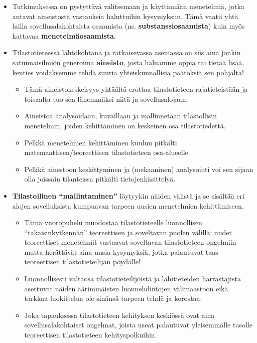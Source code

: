 \documentclass[
]{book}
\providecommand{\tightlist}{%
  \setlength{\itemsep}{0pt}\setlength{\parskip}{0pt}}
\begin{document}
\begin{itemize}
  \begin{itemize}
  \tightlist
  \item
    Tutkimuksessa on pystyttävä valitsemaan ja käyttämään menetelmiä, jotka antavat aineistosta vastauksia haluttuihin kysymyksiin. Tämä vaatii yhtä lailla sovellusalakohtaista osaamista (ns. \textbf{substanssiosaamista}) kuin myös kattavaa \textbf{menetelmäosaamista}.
  \end{itemize}
\end{itemize}

\hfill\break
\hfill\break

\begin{itemize}
\tightlist
\item
  Tilastotieteessä lähtökohtana ja ratkaisevassa asemassa on siis aina jonkin satunnaisilmiön generoima \textbf{aineisto}, josta haluamme oppia tai tietää lisää, kenties voidaksemme tehdä suuria yhteiskunnallisia päätöksiä sen pohjalta!

  \begin{itemize}
  \tightlist
  \item
    Tämä aineistokeskeisyys yhtäältä erottaa tilastotieteen rajatieteistään ja toisaalta tuo sen lähemmäksi niitä ja sovellusalojaan.
  \item
    Aineistoa analysoidaan, kuvaillaan ja mallinnetaan tilastollisin menetelmin, joiden kehittäminen on keskeinen osa tilastotiedettä.
  \item
    Pelkkä menetelmien kehittäminen kuuluu pitkälti matemaattisen/teoreettisen tilastotieteen osa-alueelle.
  \item
    Pelkkä ainestoon keskittyminen ja (mekaaninen) analysointi voi sen sijaan olla joissain tilanteissa pitkälti tietojenkäsittelyä.
  \end{itemize}
\item
  \textbf{Tilastollinen ``mallintaminen''} löytyykin näiden välistä ja se sisältää eri alojen sovelluksista kumpuavan tarpeen uusien menetelmien kehittämiseen.

  \begin{itemize}
  \tightlist
  \item
    Tämä vuoropuhelu muodostaa tilastotieteelle luonnollisen ``takaisinkytkennän'' teoreettisen ja soveltavan puolen välillä: uudet teoreettiset menetelmät vastaavat soveltavan tilastotieteen ongelmiin mutta herättävät aina uusia kysymyksiä, jotka palautuvat taas teoreettisen tilastotieteilijän pöydälle!
  \item
    Luonnollisesti valtaosa tilastotieteilijöistä ja lähitieteiden harrastajista asettuvat näiden äärimmäisten luonnehdintojen välimaastoon eikä tarkkaa luokittelua ole sinänsä tarpeen tehdä ja korostaa.
  \item
    Joka tapauksessa tilastotieteen kehityksen keskiössä ovat aina sovellusalakohtaiset ongelmat, joista useat palautuvat yleisemmälle tasolle teoreettisen tilastotieteen kehityspolkuihin.
  \end{itemize}
\end{itemize}
\end{document}
